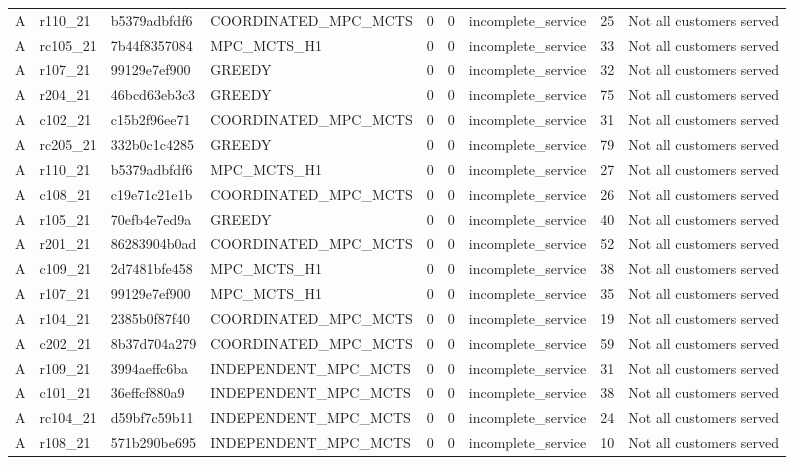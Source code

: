 \begin{table}
{\begin{tabular}{llllrrlrl}
A & r110\_21 & b5379adbfdf6 & COORDINATED\_MPC\_MCTS & 0 & 0 & incomplete\_service & 25 & Not all customers served \\
A & rc105\_21 & 7b44f8357084 & MPC\_MCTS\_H1 & 0 & 0 & incomplete\_service & 33 & Not all customers served \\
A & r107\_21 & 99129e7ef900 & GREEDY & 0 & 0 & incomplete\_service & 32 & Not all customers served \\
A & r204\_21 & 46bcd63eb3c3 & GREEDY & 0 & 0 & incomplete\_service & 75 & Not all customers served \\
A & c102\_21 & c15b2f96ee71 & COORDINATED\_MPC\_MCTS & 0 & 0 & incomplete\_service & 31 & Not all customers served \\
A & rc205\_21 & 332b0c1c4285 & GREEDY & 0 & 0 & incomplete\_service & 79 & Not all customers served \\
A & r110\_21 & b5379adbfdf6 & MPC\_MCTS\_H1 & 0 & 0 & incomplete\_service & 27 & Not all customers served \\
A & c108\_21 & c19e71c21e1b & COORDINATED\_MPC\_MCTS & 0 & 0 & incomplete\_service & 26 & Not all customers served \\
A & r105\_21 & 70efb4e7ed9a & GREEDY & 0 & 0 & incomplete\_service & 40 & Not all customers served \\
A & r201\_21 & 86283904b0ad & COORDINATED\_MPC\_MCTS & 0 & 0 & incomplete\_service & 52 & Not all customers served \\
A & c109\_21 & 2d7481bfe458 & MPC\_MCTS\_H1 & 0 & 0 & incomplete\_service & 38 & Not all customers served \\
A & r107\_21 & 99129e7ef900 & MPC\_MCTS\_H1 & 0 & 0 & incomplete\_service & 35 & Not all customers served \\
A & r104\_21 & 2385b0f87f40 & COORDINATED\_MPC\_MCTS & 0 & 0 & incomplete\_service & 19 & Not all customers served \\
A & c202\_21 & 8b37d704a279 & COORDINATED\_MPC\_MCTS & 0 & 0 & incomplete\_service & 59 & Not all customers served \\
A & r109\_21 & 3994aeffc6ba & INDEPENDENT\_MPC\_MCTS & 0 & 0 & incomplete\_service & 31 & Not all customers served \\
A & c101\_21 & 36effcf880a9 & INDEPENDENT\_MPC\_MCTS & 0 & 0 & incomplete\_service & 38 & Not all customers served \\
A & rc104\_21 & d59bf7c59b11 & INDEPENDENT\_MPC\_MCTS & 0 & 0 & incomplete\_service & 24 & Not all customers served \\
A & r108\_21 & 571b290be695 & INDEPENDENT\_MPC\_MCTS & 0 & 0 & incomplete\_service & 10 & Not all customers served \\

\end{tabular}}
\end{table}
